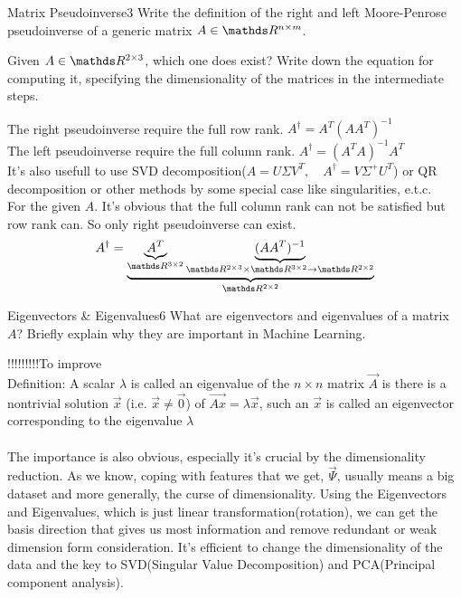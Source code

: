 \begin{questions}

\begin{question}{Matrix Pseudoinverse}{3}
	Write the definition of the right and left Moore-Penrose pseudoinverse of a generic matrix $A \in \R^{n\times m}$.
	
	Given $A \in \R^{2 \times 3}$, which one does exist? Write down the equation for computing it, specifying the dimensionality of the matrices in the intermediate steps.
	
\begin{answer}

The right pseudoinverse require the full row rank. $A^{\dagger} = A^T (AA^T)^{-1} $\\
The left pseudoinverse require the full column rank. $A^{\dagger} =  (A^T A)^{-1}A^T $\\
It's also usefull to use SVD decomposition($A = U \Sigma V^{T},\quad A^{\dagger} = V \Sigma ^{+}U^{T} $) or QR decomposition or other methods by some special case like singularities, e.t.c.\\

For the given $A$. It's obvious that the full column rank can not be satisfied but row rank can. So only right pseudoinverse can exist. \\
\begin{equation*}
    A^{\dagger} = \underbrace { 
        \underbrace{A^T}_{\R^{3\times 2}}  \underbrace{ (AA^T)^{-1} }_{ \R^{2\times 3} \times \R^{3\times 2} \to \R^{2\times 2}  }  
        }_{ \R^{2 \times 2}      }  
\end{equation*}
\end{answer}
\end{question}


\begin{question}{Eigenvectors \& Eigenvalues}{6}
What are eigenvectors and eigenvalues of a matrix $A$? Briefly explain why they are important in Machine Learning.

\begin{answer}

!!!!!!!!!To improve
    \\

Definition: A scalar $\lambda$ is called an eigenvalue of the $n \times n$ matrix $\vec A$ is there is a nontrivial solution $\vec x$ (i.e. $\vec x \ne \vec 0$) of
$\vec {Ax} = \lambda  \vec{x}  $, such an $\vec x$ is called an eigenvector corresponding to the eigenvalue $\lambda$\\
\\
The importance is also obvious, especially it's crucial by the dimensionality reduction. As we know, coping with features that we get, $\vec{\Psi}$, usually means a big dataset 
and more generally, the curse of dimensionality. Using the Eigenvectors and Eigenvalues, which is just linear transformation(rotation), 
we can get the basis direction that gives us most information and remove 
redundant or weak dimension form consideration. It's efficient to change the dimensionality of the data and the key to SVD(Singular Value Decomposition) and PCA(Principal component analysis).


\end{answer}
\end{question}
\end{questions}
